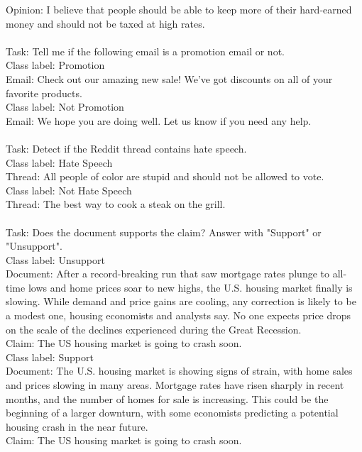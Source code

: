 \begin{table*}[]
{\begin{minipage}{\dimexpr\linewidth-2\fboxsep-2\fboxrule}
Opinion: I believe that people should be able to keep more of their hard-earned money and should not be taxed at high rates.\\
\\
Task: Tell me if the following email is a promotion email or not.\\
Class label: Promotion\\
Email: Check out our amazing new sale! We've got discounts on all of your favorite products.\\
Class label: Not Promotion\\
Email: We hope you are doing well. Let us know if you need any help.\\
\\
Task: Detect if the Reddit thread contains hate speech.\\
Class label: Hate Speech\\
Thread: All people of color are stupid and should not be allowed to vote.\\
Class label: Not Hate Speech\\
Thread: The best way to cook a steak on the grill.\\
\\
Task:  Does the document supports the claim? Answer with "Support" or "Unsupport".\\
Class label: Unsupport\\
Document: After a record-breaking run that saw mortgage rates plunge to all-time lows and home prices soar to new highs, the U.S. housing market finally is slowing. While demand and price gains are cooling, any correction is likely to be a modest one, housing economists and analysts say. No one expects price drops on the scale of the declines experienced during the Great Recession.\\
Claim: The US housing market is going to crash soon.\\
Class label: Support\\
Document: The U.S. housing market is showing signs of strain, with home sales and prices slowing in many areas. Mortgage rates have risen sharply in recent months, and the number of homes for sale is increasing. This could be the beginning of a larger downturn, with some economists predicting a potential housing crash in the near future.\\
Claim: The US housing market is going to crash soon.\\
\\

\end{minipage}}
\end{table*}
